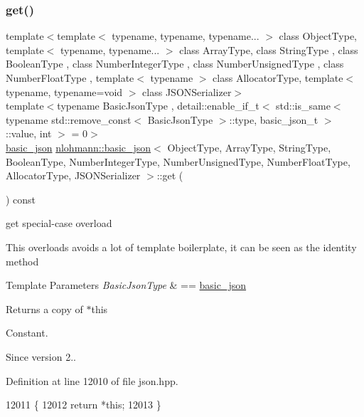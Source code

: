 \subsubsection{\texorpdfstring{get()}{get()}\hspace{0.1cm}{\footnotesize\ttfamily [1/5]}}
{\footnotesize\ttfamily template$<$template$<$ typename, typename, typename... $>$ class Object\+Type, template$<$ typename, typename... $>$ class Array\+Type, class String\+Type , class Boolean\+Type , class Number\+Integer\+Type , class Number\+Unsigned\+Type , class Number\+Float\+Type , template$<$ typename $>$ class Allocator\+Type, template$<$ typename, typename=void $>$ class J\+S\+O\+N\+Serializer$>$ \\
template$<$typename Basic\+Json\+Type , detail\+::enable\+\_\+if\+\_\+t$<$ std\+::is\+\_\+same$<$ typename std\+::remove\+\_\+const$<$ Basic\+Json\+Type $>$\+::type, basic\+\_\+json\+\_\+t $>$\+::value, int $>$  = 0$>$ \\
\hyperlink{classnlohmann_1_1basic__json}{basic\+\_\+json} \hyperlink{classnlohmann_1_1basic__json}{nlohmann\+::basic\+\_\+json}$<$ Object\+Type, Array\+Type, String\+Type, Boolean\+Type, Number\+Integer\+Type, Number\+Unsigned\+Type, Number\+Float\+Type, Allocator\+Type, J\+S\+O\+N\+Serializer $>$\+::get (\begin{DoxyParamCaption}{ }\end{DoxyParamCaption}) const\hspace{0.3cm}{\ttfamily [inline]}}



get special-\/case overload 

This overloads avoids a lot of template boilerplate, it can be seen as the identity method


\begin{DoxyTemplParams}{Template Parameters}
{\em Basic\+Json\+Type} & == \hyperlink{classnlohmann_1_1basic__json}{basic\+\_\+json}\\
\hline
\end{DoxyTemplParams}
\begin{DoxyReturn}{Returns}
a copy of $\ast$this
\end{DoxyReturn}
Constant.

\begin{DoxySince}{Since}
version 2.. 
\end{DoxySince}


Definition at line 12010 of file json.\+hpp.


\begin{DoxyCode}
12011     \{
12012         \textcolor{keywordflow}{return} *\textcolor{keyword}{this};
12013     \}
\end{DoxyCode}
\mbox{\label{classnlohmann_1_1basic__json_a16f9445f7629f634221a42b967cdcd43}} 
